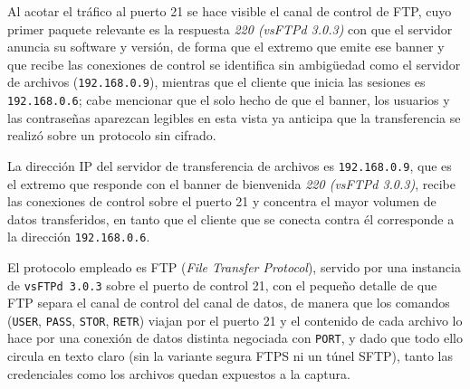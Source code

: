 

\begin{analisis}
  Al acotar el tráfico al puerto 21 se hace visible el canal de control de FTP, cuyo primer paquete relevante es la respuesta \emph{220 (vsFTPd 3.0.3)} con que el servidor anuncia su software y versión, de forma que el extremo que emite ese banner y que recibe las conexiones de control se identifica sin ambigüedad como el servidor de archivos (\texttt{192.168.0.9}), mientras que el cliente que inicia las sesiones es \texttt{192.168.0.6}; cabe mencionar que el solo hecho de que el banner, los usuarios y las contraseñas aparezcan legibles en esta vista ya anticipa que la transferencia se realizó sobre un protocolo sin cifrado.
\end{analisis}

\begin{respuesta}
  La dirección IP del servidor de transferencia de archivos es \texttt{192.168.0.9}, que es el extremo que responde con el banner de bienvenida \emph{220 (vsFTPd 3.0.3)}, recibe las conexiones de control sobre el puerto 21 y concentra el mayor volumen de datos transferidos, en tanto que el cliente que se conecta contra él corresponde a la dirección \texttt{192.168.0.6}.
\end{respuesta}

\begin{respuesta}
  El protocolo empleado es FTP (\emph{File Transfer Protocol}), servido por una instancia de \texttt{vsFTPd 3.0.3} sobre el puerto de control 21, con el pequeño detalle de que FTP separa el canal de control del canal de datos, de manera que los comandos (\texttt{USER}, \texttt{PASS}, \texttt{STOR}, \texttt{RETR}) viajan por el puerto 21 y el contenido de cada archivo lo hace por una conexión de datos distinta negociada con \texttt{PORT}, y dado que todo ello circula en texto claro (sin la variante segura FTPS ni un túnel SFTP), tanto las credenciales como los archivos quedan expuestos a la captura.
\end{respuesta}

